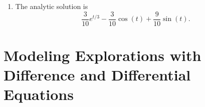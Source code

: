 \begin{example}
\begin{enumerate}
\[\begin{array}{ccc|c}
                    1 & 1 & 0 & 0 \\ 
                    0 & 1 & 1/3 & 0 \\ 
                    0 & 1/3 & -1 & -1 \end{array} \right) \to 
                \left( \begin{array}{ccc|c}  
                    1 & 0 & -1/3 & 0 \\ 
                    0 & 1 & 1/3 & 0 \\ 
                    0 & 0 & -10/9 & -1 \end{array} \right) \to 
                \left( \begin{array}{ccc|c}  
                    1 & 0 & 0 & 3/10 \\ 
                    0 & 1 & 0 & -3/10 \\ 
                    0 & 0 & 1 & 9/10 \end{array} \right).
            \]
        \item The analytic solution is
            \[ \frac{3}{10} e^{t/3} - \frac{3}{10} \cos(t) + \frac{9}{10} \sin(t). \]
    \end{enumerate}
\end{example}




\newpage\section{Modeling Explorations with Difference and Differential Equations}

